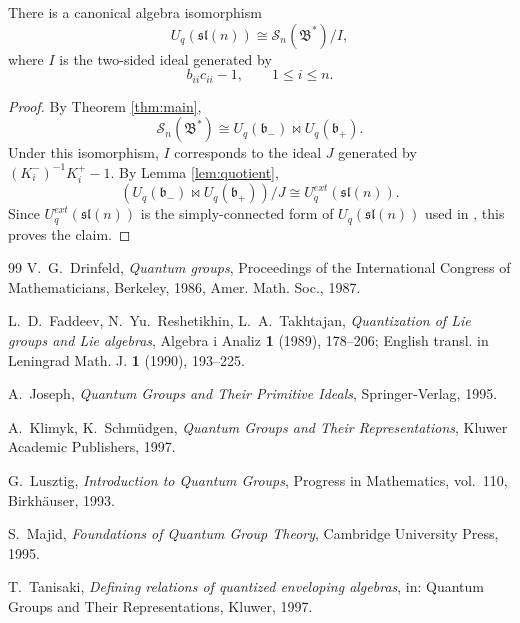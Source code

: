 \documentclass[11pt]{article}
\newcommand{\cS}{\mathcal S}
\newcommand{\fb}{\mathfrak b}
\newcommand{\slq}{\mathfrak{sl}(n)}
\newcommand{\Uq}{U_q}
\newcommand{\bipr}{\bowtie}
\begin{document}
\begin{theorem}
There is a canonical algebra isomorphism
\[
\Uq(\slq)\cong \cS_n(\mathfrak B^*)/I,
\]
where \(I\) is the two-sided ideal generated by
\[
b_{ii}c_{ii}-1,\qquad 1\le i\le n.
\]
\end{theorem}

\begin{proof}
By Theorem \ref{thm:main},
\[
\cS_n(\mathfrak B^*)\cong \Uq(\fb_-)\bipr\Uq(\fb_+).
\]
Under this isomorphism, \(I\) corresponds to the ideal \(J\) generated by \((K_i^-)^{-1}K_i^+-1\).  By Lemma \ref{lem:quotient},
\[
(\Uq(\fb_-)\bipr\Uq(\fb_+))/J\cong \Uq^{ext}(\slq).
\]
Since \(\Uq^{ext}(\slq)\) is the simply-connected form of \(U_q(\slq)\) used in \cite{KS}, this proves the claim.
\end{proof}

\begin{thebibliography}{99}
V.~G.~Drinfeld, \emph{Quantum groups}, Proceedings of the International Congress of Mathematicians, Berkeley, 1986, Amer. Math. Soc., 1987.

L.~D.~Faddeev, N.~Yu.~Reshetikhin, L.~A.~Takhtajan, \emph{Quantization of Lie groups and Lie algebras}, Algebra i Analiz \textbf{1} (1989), 178--206; English transl. in Leningrad Math. J. \textbf{1} (1990), 193--225.

A.~Joseph, \emph{Quantum Groups and Their Primitive Ideals}, Springer-Verlag, 1995.

A.~Klimyk, K.~Schm\"udgen, \emph{Quantum Groups and Their Representations}, Kluwer Academic Publishers, 1997.

G.~Lusztig, \emph{Introduction to Quantum Groups}, Progress in Mathematics, vol.~110, Birkh\"auser, 1993.

S.~Majid, \emph{Foundations of Quantum Group Theory}, Cambridge University Press, 1995.

T.~Tanisaki, \emph{Defining relations of quantized enveloping algebras}, in: Quantum Groups and Their Representations, Kluwer, 1997.
\end{thebibliography}
\end{document}
